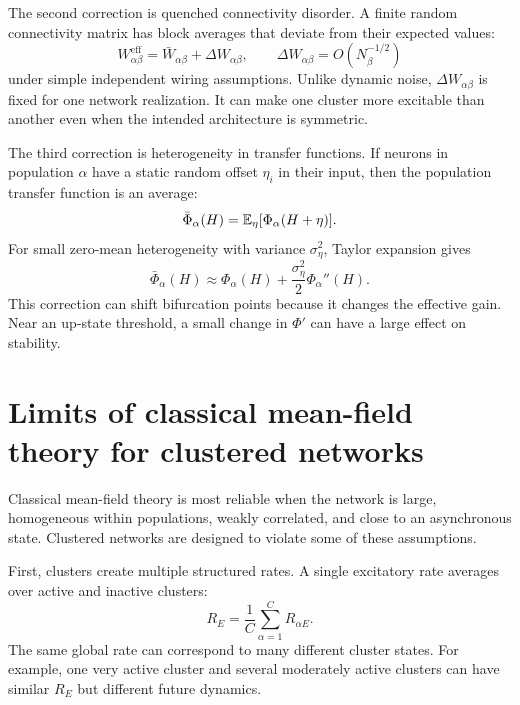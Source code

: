 The second correction is quenched connectivity disorder. A finite random connectivity matrix has block averages that deviate from their expected values:
%
\begin{equation}
  W_{\alpha\beta}^{\mathrm{eff}}
  =
  \bar W_{\alpha\beta}
  +
  \Delta W_{\alpha\beta},
  \qquad
  \Delta W_{\alpha\beta}=O(N_\beta^{-1/2})
  \label{eq:quenched-weight-correction}
\end{equation}
%
under simple independent wiring assumptions. Unlike dynamic noise, $\Delta W_{\alpha\beta}$ is fixed for one network realization. It can make one cluster more excitable than another even when the intended architecture is symmetric.

The third correction is heterogeneity in transfer functions. If neurons in population $\alpha$ have a static random offset $\eta_i$ in their input, then the population transfer function is an average:
%
\begin{equation}
  \bar\Phi_\alpha(H)
  =
  \mathbb{E}_\eta[\Phi_\alpha(H+\eta)].
  \label{eq:heterogeneous-transfer-average}
\end{equation}
%
For small zero-mean heterogeneity with variance $\sigma_\eta^2$, Taylor expansion gives
%
\begin{equation}
  \bar\Phi_\alpha(H)
  \approx
  \Phi_\alpha(H)
  +
  \frac{\sigma_\eta^2}{2}\Phi_\alpha''(H).
  \label{eq:transfer-heterogeneity-taylor}
\end{equation}
%
This correction can shift bifurcation points because it changes the effective gain. Near an up-state threshold, a small change in $\Phi'$ can have a large effect on stability.

\section{Limits of classical mean-field theory for clustered networks}
\label{sec:limits-classical-mean-field-clustered}

Classical mean-field theory is most reliable when the network is large, homogeneous within populations, weakly correlated, and close to an asynchronous state. Clustered networks are designed to violate some of these assumptions.

First, clusters create multiple structured rates. A single excitatory rate averages over active and inactive clusters:
%
\begin{equation}
  R_E
  =
  \frac{1}{C}\sum_{\alpha=1}^C R_{\alpha E}.
  \label{eq:global-rate-averages-clusters}
\end{equation}
%
The same global rate can correspond to many different cluster states. For example, one very active cluster and several moderately active clusters can have similar $R_E$ but different future dynamics.


